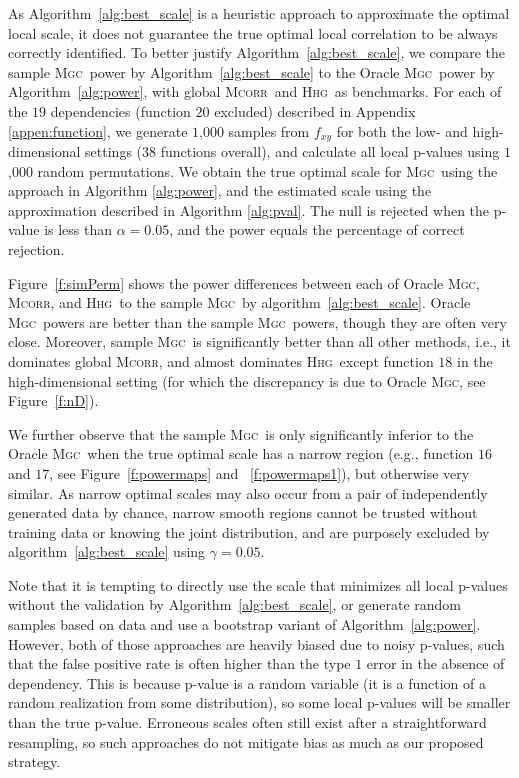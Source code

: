 \documentclass[11pt]{article}
\providecommand{\sct}[1]{{\normalfont\textsc{#1}}}
\newcommand{\Mgc}{\sct{Mgc}}
\newcommand{\Hhg}{\sct{Hhg}}
\newcommand{\Mcorr}{\sct{Mcorr}}
\begin{document}
As Algorithm~\ref{alg:best_scale} is a heuristic approach to approximate the optimal local scale, it does not guarantee the true optimal local correlation to be always correctly identified. To better justify Algorithm~\ref{alg:best_scale}, we compare the sample \Mgc~power by Algorithm~\ref{alg:best_scale} to the Oracle \Mgc~power by Algorithm~\ref{alg:power}, with  global \Mcorr~and \Hhg~as benchmarks. For each of the $19$ dependencies (function $20$ excluded) described in Appendix \ref{appen:function}, we generate $1$,$000$ samples from $f_{xy}$ for both the low- and high-dimensional settings ($38$ functions overall), and calculate all local p-values using $1$,$000$ random permutations. 
We obtain the true optimal scale for \Mgc~using the approach in Algorithm \ref{alg:power}, and the estimated scale using the approximation described in Algorithm \ref{alg:pval}.  
The null is rejected when the p-value is less than $\alpha=0.05$, and the power equals the percentage of correct rejection. 

Figure~\ref{f:simPerm} shows the power differences between each of Oracle \Mgc, \Mcorr, and \Hhg~to the sample \Mgc~by algorithm~\ref{alg:best_scale}. Oracle \Mgc~powers are better than the sample \Mgc~powers, though they are often very close. Moreover, sample \Mgc~is significantly better than all other methods, i.e., it dominates global \Mcorr, and almost dominates \Hhg~except function $18$ in the high-dimensional setting (for which the discrepancy is due to Oracle \Mgc, see Figure~\ref{f:nD}). 

We further observe that the sample \Mgc~is only significantly inferior to the Oracle \Mgc~when the true optimal scale has a narrow region (e.g., function $16$ and $17$, see Figure~\ref{f:powermaps} and ~\ref{f:powermaps1}), but otherwise very similar. As narrow optimal scales may also occur from a pair of independently generated data by chance, narrow smooth regions cannot be trusted without training data or knowing the joint distribution, and are purposely excluded by algorithm~\ref{alg:best_scale} using $\gamma=0.05$.

Note that it is tempting to directly use the scale that minimizes all local p-values without the validation by Algorithm~\ref{alg:best_scale}, or generate random samples based on  data  and use a bootstrap variant of Algorithm~\ref{alg:power}. However, both of those approaches are heavily biased due to noisy p-values, such that the false positive rate is often higher than the type $1$ error in the absence of dependency. This is because p-value is a random variable (it is a function of a random realization from some distribution), so some local p-values will be smaller than the true p-value. Erroneous scales often still exist after a straightforward resampling, so such approaches do not mitigate bias as much as our proposed strategy. 
\end{document}
